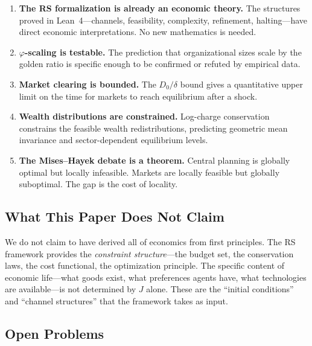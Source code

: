 \documentclass[11pt,a4paper]{article}
\theoremstyle{plain}
\theoremstyle{definition}
\theoremstyle{remark}
\newcommand{\Jcost}{J}
\begin{document}
\begin{enumerate}[nosep]
\item \textbf{The RS formalization is already an economic theory.}
The structures proved in Lean~4---channels, feasibility, complexity, refinement, halting---have direct economic interpretations.
No new mathematics is needed.

\item \textbf{$\varphi$-scaling is testable.}
The prediction that organizational sizes scale by the golden ratio is specific enough to be confirmed or refuted by empirical data.

\item \textbf{Market clearing is bounded.}
The $D_0/\delta$ bound gives a quantitative upper limit on the time for markets to reach equilibrium after a shock.

\item \textbf{Wealth distributions are constrained.}
Log-charge conservation constrains the feasible wealth redistributions, predicting geometric mean invariance and sector-dependent equilibrium levels.

\item \textbf{The Mises--Hayek debate is a theorem.}
Central planning is globally optimal but locally infeasible.
Markets are locally feasible but globally suboptimal.
The gap is the cost of locality.
\end{enumerate}

\subsection{What This Paper Does Not Claim}

We do not claim to have derived all of economics from first principles.
The RS framework provides the \emph{constraint structure}---the budget set, the conservation laws, the cost functional, the optimization principle.
The specific content of economic life---what goods exist, what preferences agents have, what technologies are available---is not determined by $\Jcost$ alone.
These are the ``initial conditions'' and ``channel structures'' that the framework takes as input.

\subsection{Open Problems}
\end{document}

